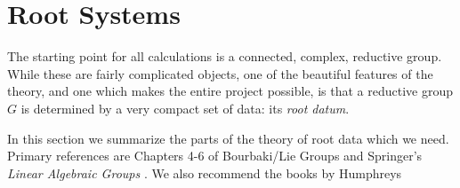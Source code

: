 \chapter{Root Systems}  
\label{root}

The starting point for all \Atlas calculations is a connected,
complex, reductive group. While these are fairly complicated objects,
one of the beautiful features of the theory, and one which makes the
entire \Atlas project possible, is that a reductive group $G$ is 
determined by a very compact set of data: its {\it root datum}. 

In this section we summarize the parts of the theory of root data
which we need. Primary references are Chapters 4-6 of Bourbaki/Lie Groups
\cite{bourbaki_4-6} and  Springer's {\it Linear Algebraic Groups} \cite{springer_book}. We also recommend
the books by Humphreys

